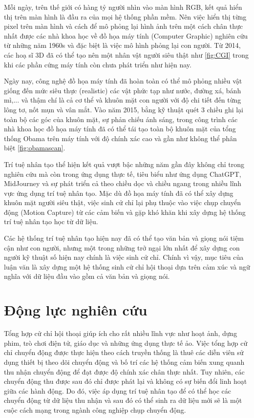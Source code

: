 Mỗi ngày, trên thế giới có hàng tỷ người nhìn vào màn hình RGB, kết quả hiển thị trên màn hình là đầu ra của mọi hệ thống phần mềm. Nên việc hiển thị từng pixel trên màn hình và cách để mô phỏng lại hình ảnh trên một cách chân thực nhất được các nhà khoa học về đồ họa máy tính (Computer Graphic) nghiên cứu từ những năm 1960s và đặc biệt là việc mô hình phỏng lại con người. Từ 2014, các hoạ sĩ 3D đã có thể tạo nên một nhân vật người siêu thật như \autoref{fig:CGI} trong khi các phần cứng máy tính còn chưa phát triển như hiện nay. 

Ngày nay, công nghệ đồ họa máy tính đã hoàn toàn có thể mô phỏng nhiều vật giống đến mức siêu thực (realistic) các vật phức tạp như nước, đường xá, bánh mì,...  và thậm chí là cả cơ thể và khuôn mặt con người với độ chi tiết đến từng lông tơ, nốt mụn và vân mắt. 
Vào năm 2015, bằng kỹ thuật quét 3 chiều ghi lại toàn bộ các góc của khuôn mặt, sự phản chiếu ánh sáng, trong công trình \cite{metallo2015scanning}
các nhà khoa học đồ họa máy tính đã có thể tái tạo toàn bộ khuôn mặt của tổng thống Obama trên máy tính với độ chính xác cao và gần như không thể phân biệt \autoref{fig:obamascan}.

Trí tuệ nhân tạo thể hiện kết quả vượt bậc những năm gần đây không chỉ trong nghiên cứu mà còn trong ứng dụng thực tế, tiêu biểu như ứng dụng ChatGPT, MidJourney và sự phát triển cả theo chiều dọc và chiều ngang trong nhiều lĩnh vực ứng dụng trí tuệ nhân tạo. Mặc dù đồ họa máy tính đã có thể xây dựng khuôn mặt người siêu thật, việc sinh cử chỉ lại phụ thuộc vào việc chụp chuyển động (Motion Capture) từ các cảm biến và gặp khó khăn khi xây dựng hệ thống trí tuệ nhân tạo học từ dữ liệu.

Các hệ thống trí tuệ nhân tạo hiện nay đã có thể tạo văn bản và giọng nói tiệm cận như con người, nhưng một trong những trở ngại lớn nhất để xây dựng con người kỹ thuật số hiện nay chính là việc sinh cử chỉ. Chính vì vậy, mục tiêu của luận văn là xây dựng một hệ thống sinh cử chỉ hội thoại dựa trên cảm xúc và ngữ nghĩa với dữ liệu đầu vào gồm cả văn bản và giọng nói.

\section{Động lực nghiên cứu}

Tổng hợp cử chỉ hội thoại giúp ích cho rất nhiều lĩnh vực như hoạt ảnh, dựng phim, trò chơi điện tử, giáo dục và những ứng dụng thực tế ảo. Việc tổng hợp cử chỉ chuyển động được thực hiện theo cách truyền thống là thuê các diễn viên sử dụng thiết bị theo dõi chuyển động và bố trí các hệ thống cảm biến xung quanh thu nhận chuyển động để đạt được độ chính xác chân thực nhất. Tuy nhiên, các chuyển động thu được sau đó chỉ được phát lại và không có sự biến đổi linh hoạt giữa các hành động. Do đó, việc áp dụng trí tuệ nhân tạo để có thể học các chuyển động từ dữ liệu thu nhận và sau đó có thể sinh ra dữ liệu mới sẽ là một cuộc cách mạng trong ngành công nghiệp chụp chuyển động.

